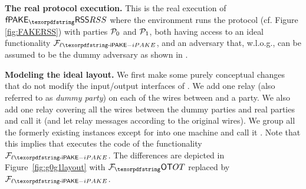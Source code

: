 \begin{games}
\textbf{The real protocol execution.}
This is the real execution of $\PfakeRSS$ where the environment \Env runs the protocol (cf. Figure \ref{fig:FAKERSS}) with parties $\mathcal{P}_{0}$ and $\mathcal{P}_{1}$, both having access to an ideal \liPAKE functionality $\FliPAKE$, and an adversary \AdvA that, w.l.o.g., can be assumed to be the dummy adversary as shown in \cite[section 4.4.1]{FOCS:Canetti01}.

\textbf{Modeling the ideal layout.}
We first make some purely conceptual changes that do not modify the input/output interfaces of \Env. We add one relay (also referred to as \emph{dummy party}) on each of the wires between \Env and a party. We also add one relay covering all the wires between the dummy parties and real parties and call it \Func (and let \Func relay messages according to the original wires). We group all the formerly existing instances except for \Env into one machine and call it \Sim. Note that this implies that \Sim executes the code of the \liPAKE functionality $\FliPAKE$. The differences are depicted in Figure~\ref{fig:g0g1layout} with $\Fot$ replaced by $\FliPAKE$.


\end{games}
